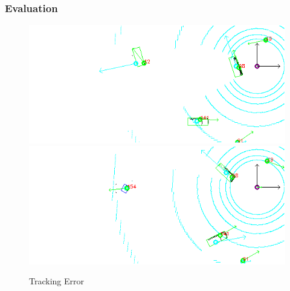 \documentclass[nosymbols]{beamer}	%
\begin{document}
\begin{frame}
\frametitle{Evaluation}
\begin{figure}[!ht]
\begin{center}
\caption{Tracking Error}

    \begin{minipage}[t]{0.49\textwidth}
        \centering
        \includegraphics[width=\textwidth]{bilder/alg/lost_wob.png}
    \end{minipage}%
    \hfill
    \begin{minipage}[t]{0.49\textwidth}
        \centering
	\includegraphics[width=\textwidth]{bilder/alg/redetect_wob.png}
    \end{minipage}
\label{obst_cases}
\end{center}
\end{figure}
\end{frame}
\end{document}
